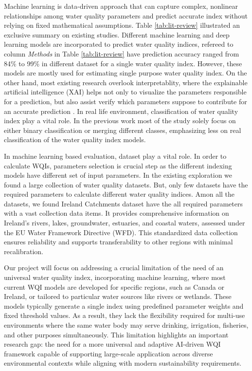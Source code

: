 \documentclass[conference]{IEEEtran}
\begin{document}
Machine learning is data-driven approach that can capture complex, nonlinear relationships among water quality parameters and predict accurate index without relying on fixed mathematical assumptions. Table \ref{tab:lit-review} illustrated an exclusive summary on existing studies. Different machine learning and deep learning models are incorporated to predict water quality indices, refereed to column \textit{Methods} in Table \ref{tab:lit-review} have prediction accuracy ranged from 84\% to 99\% in different dataset for a single water quality index. However, these models are mostly used for estimating single purpose water quality index. On the other hand, most existing research overlook interpretablity, where the explainable artificial intelligence (XAI) helps not only to visualize the parameters responsible for a prediction, but also assist verify which parameters suppose to contribute for an accurate prediction \cite{makumbura2024advancing}. In real life environment, classification of water quality index play a vital role. In the previous work most of the study solely focus on either binary classification or merging different classes, emphasizing less on real classification of the water quality index models. 

In machine learning based evaluation, dataset play a vital role. In order to calculate WQIs, parameters selection is crucial step as the different indexing models have different set of input parameters. In the existing exploration we found a large collection of water quality datasets. But, only few datasets have the required parameters to calculate different water quality indices. Amon all the datasets, we found Ireland Catchments dataset have the all required parameters with a vast collection data items. It provides comprehensive information on Ireland’s rivers, lakes, groundwater, estuaries, and coastal waters, assessed under the EU Water Framework Directive (WFD). This standardized data collection ensures reliability and supports transferability to other regions with minimal recalibration.

Our project will focus on addressing a crucial limitation of the need of an universal water quality index, incorporating machine learning, where most current WQI models are developed for specific regions, such as Canada or Ireland, or tailored to particular water sources like rivers or wetlands. These models typically generate a single index using predefined parameter weights and fixed threshold values. As a result, they lack the flexibility required for multi-use environments where the same water body may serve drinking, irrigation, fisheries, and other purposes simultaneously. This limitation highlights an important research gap: the need for a more universal and adaptive AI-driven WQI framework capable of supporting large-scale application across diverse environmental contexts while aligning with modern sustainability requirements.
\end{document}
